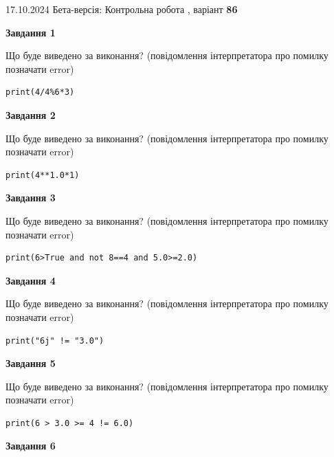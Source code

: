 \documentclass[12pt, ukrainian]{article}
\begin{document}
{\Large{17.10.2024 Бета-версія: Контрольна робота , варіант  \No \textbf { 86 }\par}}
{
\begin {large}
{\begin {center}\textbf{Завдання 1}\end {center}}

Що буде виведено за виконання? (повідомлення інтерпретатора про помилку позначати error)\par
\begin{verbatim}
print(4/4%6*3)
\end{verbatim}

{\begin {center}\textbf{Завдання 2}\end {center}}

Що буде виведено за виконання? (повідомлення інтерпретатора про помилку позначати error)\par
\begin{verbatim}
print(4**1.0*1)
\end{verbatim}

{\begin {center}\textbf{Завдання 3}\end {center}}

Що буде виведено за виконання? (повідомлення інтерпретатора про помилку позначати error)\par
\begin{verbatim}
print(6>True and not 8==4 and 5.0>=2.0)
\end{verbatim}

{\begin {center}\textbf{Завдання 4}\end {center}}

Що буде виведено за виконання? (повідомлення інтерпретатора про помилку позначати error)\par
\begin{verbatim}
print("6j" != "3.0")
\end{verbatim}

{\begin {center}\textbf{Завдання 5}\end {center}}

Що буде виведено за виконання? (повідомлення інтерпретатора про помилку позначати error)\par
\begin{verbatim}
print(6 > 3.0 >= 4 != 6.0)
\end{verbatim}

{\begin {center}\textbf{Завдання 6}\end {center}}


\end{large}}
\end{document}

